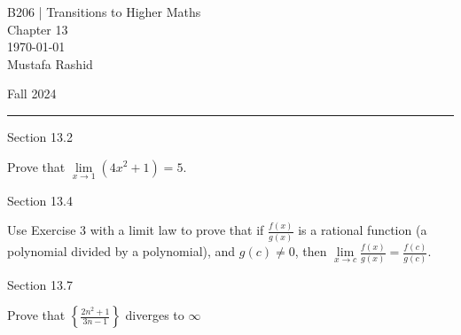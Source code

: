 \documentclass[12pt,letterpaper, onecolumn]{exam}
\begin{document}
	\begingroup  
	\noindent\LARGE B206 | Transitions to Higher Maths\\
	\noindent\LARGE Chapter 13\\
	\noindent\large \today\\
	\noindent\large Mustafa Rashid\par
	\noindent\large Fall 2024\par
	\endgroup
	\rule{\textwidth}{0.4pt}
	\pointsdroppedatright
	\printanswers
	\renewcommand{\solutiontitle}{\noindent\textbf{Ans:}\enspace}  
	\centerline{Section 13.2}
	\begin{questions}
		\setcounter{question}{5}\question Prove that $\lim\limits_{x\rightarrow1}(4x^2+1)=5$.
	\end{questions}	
	\centerline{Section 13.4}
	\begin{questions}
		\setcounter{question}{3}\question 
		Use Exercise 3 with a limit law to prove that if $\frac{f(x)}{g(x)}$ is a rational function (a polynomial divided by a polynomial), and $g(c)\neq0$, then $\lim\limits_{x\rightarrow c}\frac{f(x)}{g(x)}=\frac{f(c)}{g(c)}$.
	\end{questions}
	\centerline{Section 13.7}
	\begin{questions}
			\setcounter{question}{1}\question Prove that $\left\{\frac{2n^2+1}{3n-1}\right\}$ diverges to $\infty$
	\end{questions}
\end{document}
